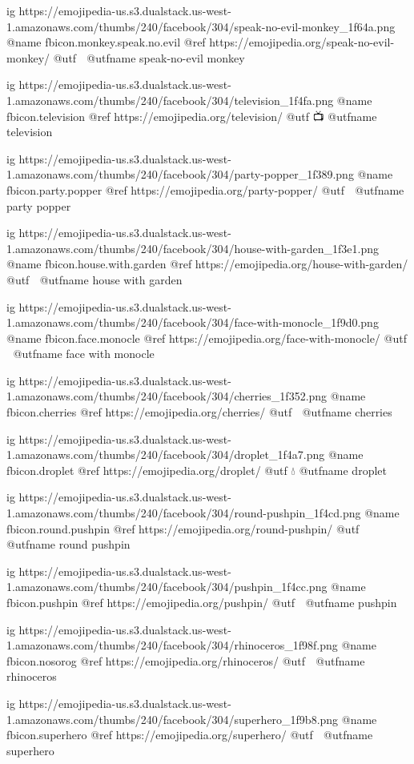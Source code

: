   ig https://emojipedia-us.s3.dualstack.us-west-1.amazonaws.com/thumbs/240/facebook/304/speak-no-evil-monkey_1f64a.png
  @name fbicon.monkey.speak.no.evil
  @ref https://emojipedia.org/speak-no-evil-monkey/
  @utf 🙊
  @utfname speak-no-evil monkey


  ig https://emojipedia-us.s3.dualstack.us-west-1.amazonaws.com/thumbs/240/facebook/304/television_1f4fa.png
  @name fbicon.television
  @ref https://emojipedia.org/television/
  @utf 📺
  @utfname television

  ig https://emojipedia-us.s3.dualstack.us-west-1.amazonaws.com/thumbs/240/facebook/304/party-popper_1f389.png
  @name fbicon.party.popper
  @ref https://emojipedia.org/party-popper/
  @utf 🎉
  @utfname party popper

  ig https://emojipedia-us.s3.dualstack.us-west-1.amazonaws.com/thumbs/240/facebook/304/house-with-garden_1f3e1.png
  @name fbicon.house.with.garden
  @ref https://emojipedia.org/house-with-garden/
  @utf 🏡
  @utfname house with garden

  ig https://emojipedia-us.s3.dualstack.us-west-1.amazonaws.com/thumbs/240/facebook/304/face-with-monocle_1f9d0.png
  @name fbicon.face.monocle
  @ref https://emojipedia.org/face-with-monocle/
  @utf 🧐
  @utfname face with monocle

  ig https://emojipedia-us.s3.dualstack.us-west-1.amazonaws.com/thumbs/240/facebook/304/cherries_1f352.png
  @name fbicon.cherries
  @ref https://emojipedia.org/cherries/
  @utf 🍒
  @utfname cherries

  ig https://emojipedia-us.s3.dualstack.us-west-1.amazonaws.com/thumbs/240/facebook/304/droplet_1f4a7.png
  @name fbicon.droplet
  @ref https://emojipedia.org/droplet/
  @utf 💧
  @utfname droplet

  ig https://emojipedia-us.s3.dualstack.us-west-1.amazonaws.com/thumbs/240/facebook/304/round-pushpin_1f4cd.png
  @name fbicon.round.pushpin
  @ref https://emojipedia.org/round-pushpin/
  @utf 📍
  @utfname round pushpin

  ig https://emojipedia-us.s3.dualstack.us-west-1.amazonaws.com/thumbs/240/facebook/304/pushpin_1f4cc.png
  @name fbicon.pushpin
  @ref https://emojipedia.org/pushpin/
  @utf 📌
  @utfname pushpin

  ig https://emojipedia-us.s3.dualstack.us-west-1.amazonaws.com/thumbs/240/facebook/304/rhinoceros_1f98f.png
  @name fbicon.nosorog
  @ref https://emojipedia.org/rhinoceros/
  @utf 🦏
  @utfname rhinoceros

  ig https://emojipedia-us.s3.dualstack.us-west-1.amazonaws.com/thumbs/240/facebook/304/superhero_1f9b8.png
  @name fbicon.superhero
  @ref https://emojipedia.org/superhero/
  @utf 🦸
  @utfname superhero

